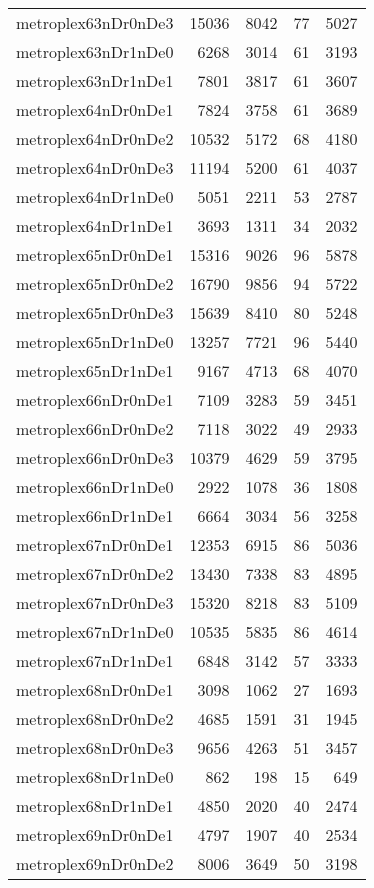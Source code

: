 \begin{longtable}{lrrrr}
metroplex63nDr0nDe3 & 15036 & 8042 & 77 & 5027 \\
metroplex63nDr1nDe0 & 6268 & 3014 & 61 & 3193 \\
metroplex63nDr1nDe1 & 7801 & 3817 & 61 & 3607 \\
metroplex64nDr0nDe1 & 7824 & 3758 & 61 & 3689 \\
metroplex64nDr0nDe2 & 10532 & 5172 & 68 & 4180 \\
metroplex64nDr0nDe3 & 11194 & 5200 & 61 & 4037 \\
metroplex64nDr1nDe0 & 5051 & 2211 & 53 & 2787 \\
metroplex64nDr1nDe1 & 3693 & 1311 & 34 & 2032 \\
metroplex65nDr0nDe1 & 15316 & 9026 & 96 & 5878 \\
metroplex65nDr0nDe2 & 16790 & 9856 & 94 & 5722 \\
metroplex65nDr0nDe3 & 15639 & 8410 & 80 & 5248 \\
metroplex65nDr1nDe0 & 13257 & 7721 & 96 & 5440 \\
metroplex65nDr1nDe1 & 9167 & 4713 & 68 & 4070 \\
metroplex66nDr0nDe1 & 7109 & 3283 & 59 & 3451 \\
metroplex66nDr0nDe2 & 7118 & 3022 & 49 & 2933 \\
metroplex66nDr0nDe3 & 10379 & 4629 & 59 & 3795 \\
metroplex66nDr1nDe0 & 2922 & 1078 & 36 & 1808 \\
metroplex66nDr1nDe1 & 6664 & 3034 & 56 & 3258 \\
metroplex67nDr0nDe1 & 12353 & 6915 & 86 & 5036 \\
metroplex67nDr0nDe2 & 13430 & 7338 & 83 & 4895 \\
metroplex67nDr0nDe3 & 15320 & 8218 & 83 & 5109 \\
metroplex67nDr1nDe0 & 10535 & 5835 & 86 & 4614 \\
metroplex67nDr1nDe1 & 6848 & 3142 & 57 & 3333 \\
metroplex68nDr0nDe1 & 3098 & 1062 & 27 & 1693 \\
metroplex68nDr0nDe2 & 4685 & 1591 & 31 & 1945 \\
metroplex68nDr0nDe3 & 9656 & 4263 & 51 & 3457 \\
metroplex68nDr1nDe0 & 862 & 198 & 15 & 649 \\
metroplex68nDr1nDe1 & 4850 & 2020 & 40 & 2474 \\
metroplex69nDr0nDe1 & 4797 & 1907 & 40 & 2534 \\
metroplex69nDr0nDe2 & 8006 & 3649 & 50 & 3198 \\

\end{longtable}
